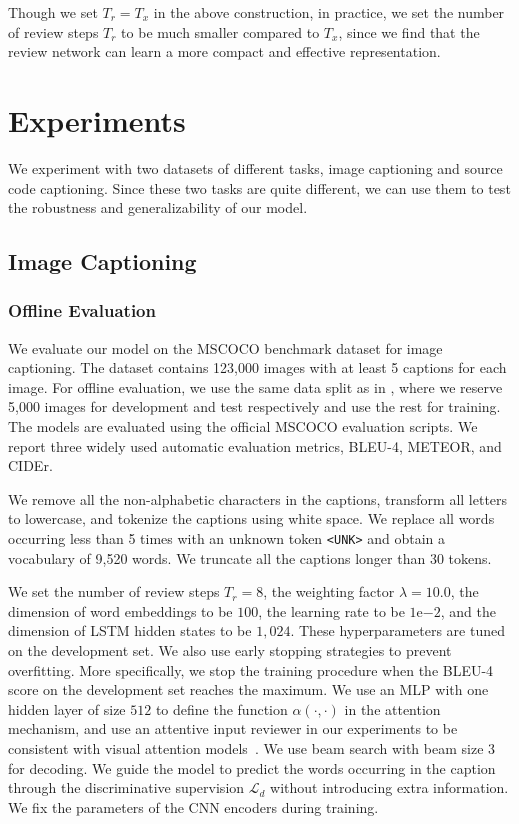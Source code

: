 \documentclass{article}
\begin{document}
Though we set $T_r = T_x$ in the above construction, in practice, we set the number of review steps $T_r$ to be much smaller compared to $T_x$, since we find that the review network can learn a more compact and effective representation.


\section{Experiments}

We experiment with two datasets of different tasks, image captioning and source code captioning. Since these two tasks are quite different, we can use them to test the robustness and generalizability of our model.

\subsection{Image Captioning}\subsubsection{Offline Evaluation}

We evaluate our model on the MSCOCO benchmark dataset \cite{chen2015microsoft} for image captioning. The dataset contains 123,000 images with at least 5 captions for each image. For offline evaluation, we use the same data split as in \cite{karpathy2015deep,xu2015show,you2016image}, where we reserve 5,000 images for development and test respectively and use the rest for training. The models are evaluated using the official MSCOCO evaluation scripts. We report three widely used automatic evaluation metrics, BLEU-4, METEOR, and CIDEr.

We remove all the non-alphabetic characters in the captions, transform all letters to lowercase, and tokenize the captions using white space. We replace all words occurring less than 5 times with an unknown token \texttt{<UNK>} and obtain a vocabulary of 9,520 words. We truncate all the captions longer than 30 tokens.

We set the number of review steps $T_r = 8$, the weighting factor $\lambda = 10.0$, the dimension of word embeddings to be $100$, the learning rate to be $1\mathrm{e}{-2}$, and the dimension of LSTM hidden states to be $1,024$. These hyperparameters are tuned on the development set. We also use early stopping strategies to prevent overfitting. More specifically, we stop the training procedure when the BLEU-4 score on the development set reaches the maximum. We use an MLP with one hidden layer of size $512$ to define the function $\alpha(\cdot, \cdot)$ in the attention mechanism, and use an attentive input reviewer in our experiments to be consistent with visual attention models~\cite{xu2015show}. We use beam search with beam size 3 for decoding. We guide the model to predict the words occurring in the caption through the discriminative supervision $\mathcal{L}_d$ without introducing extra information. We fix the parameters of the CNN encoders during training.
\end{document}
